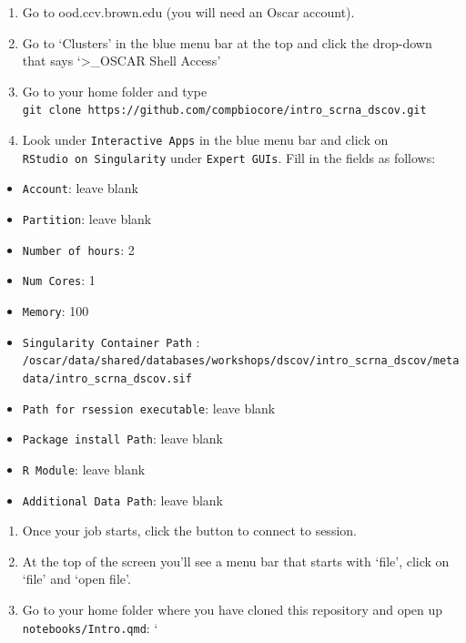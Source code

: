 \documentclass[
  letterpaper,
  DIV=11,
  numbers=noendperiod]{scrreprt}
\providecommand{\tightlist}{%
  \setlength{\itemsep}{0pt}\setlength{\parskip}{0pt}}
\begin{document}
\begin{enumerate}
\def\labelenumi{\arabic{enumi}.}
\tightlist
\item
  Go to ood.ccv.brown.edu (you will need an Oscar account).
\item
  Go to `Clusters' in the blue menu bar at the top and click the
  drop-down that says `\textgreater\_OSCAR Shell Access'
\item
  Go to your home folder and type
  \texttt{git\ clone\ https://github.com/compbiocore/intro\_scrna\_dscov.git}
\item
  Look under \texttt{Interactive\ Apps} in the blue menu bar and click
  on \texttt{RStudio\ on\ Singularity} under \texttt{Expert\ GUIs}. Fill
  in the fields as follows:
\end{enumerate}

\begin{itemize}
\tightlist
\item
  \texttt{Account}: leave blank\\
\item
  \texttt{Partition}: leave blank\\
\item
  \texttt{Number\ of\ hours}: 2\\
\item
  \texttt{Num\ Cores}: 1\\
\item
  \texttt{Memory}: 100\\
\item
  \texttt{Singularity\ Container\ Path} :
  \texttt{/oscar/data/shared/databases/workshops/dscov/intro\_scrna\_dscov/metadata/intro\_scrna\_dscov.sif}\\
\item
  \texttt{Path\ for\ rsession\ executable}: leave blank\\
\item
  \texttt{Package\ install\ Path}: leave blank\\
\item
  \texttt{R\ Module}: leave blank\\
\item
  \texttt{Additional\ Data\ Path}: leave blank\\
\end{itemize}

\begin{enumerate}
\def\labelenumi{\arabic{enumi}.}
\setcounter{enumi}{4}
\tightlist
\item
  Once your job starts, click the button to connect to session.\\
\item
  At the top of the screen you'll see a menu bar that starts with
  `file', click on `file' and `open file'.\\
\item
  Go to your home folder where you have cloned this repository and open
  up \texttt{notebooks/Intro.qmd}: `
\end{enumerate}
\end{document}
